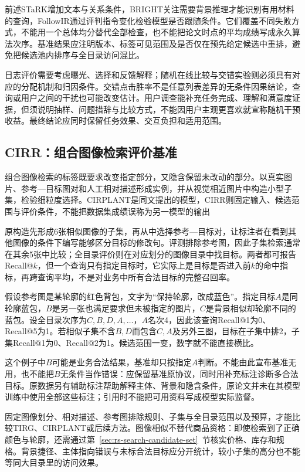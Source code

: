 前述STaRK增加文本与关系条件，BRIGHT关注需要背景推理才能识别有用材料的查询，FollowIR通过评判指令变化检验模型是否跟随条件。它们覆盖不同失败方式，不能用一个总体均分替代全部检查，也不能把论文时点的平均成绩写成永久算法次序。基准结果应注明版本、标签可见范围及是否仅在预先给定候选中重排，避免把候选池内排序与全目录访问混比。

日志评价需要考虑曝光、选择和反馈解释；随机在线比较与交错实验则必须具有对应的分配机制和归因条件。交错点击胜率不是任意列表差异的无条件因果结论，查询或用户之间的干扰也可能改变估计。用户调查能补充任务完成、理解和满意度证据，但须说明抽样、问题措辞与比较方式，不能因用户主观更喜欢就宣称随机干预收益。最终结论应同时保留任务效果、交互负担和适用范围。

\subsection{CIRR：组合图像检索评价基准}
\label{sec:rs-search-cirr}

组合图像检索的标签既要求改变指定部分，又隐含保留未改动的部分。以真实图片、参考—目标图对和人工相对描述形成实例，并从视觉相近图片中构造小型子集，检验细粒度选择。CIRPLANT是同文提出的模型，CIRR则固定输入、候选范围与评价条件，不能把数据集成绩误称为另一模型的输出

原构造先形成6张相似图像的子集，再从中选择参考—目标对，让标注者在看到其他图像的条件下编写能够区分目标的修改句。评测排除参考图，因此子集检索通常在其余5张中比较；全目录评价则在对应划分的图像目录中找目标。两者都可报告Recall@$k$，但一个查询只有指定目标时，它实际上是目标是否进入前$k$的命中指标，再跨查询平均，不是对业务中所有合法目标的完整召回率。

假设参考图是某轮廓的红色背包，文字为“保持轮廓，改成蓝色”。指定目标$A$是同轮廓蓝包，$B$是另一张也满足要求但未被指定的图片，$C$是背景相似却轮廓不同的蓝包。设全目录次序为$C,B,D,A,\ldots$，$A$名次4，因此该查询Recall@1为0、Recall@5为1。若相似子集不含$B,D$而包含$C,A$及另外三图，目标在子集中排2，子集Recall@1为0、Recall@2为1。候选范围一变，数字就不能直接横比。

这个例子中$B$可能是业务合法结果，基准却只按指定$A$判断。不能由此宣布基准无用，也不能把$B$无条件当作错误：应保留基准原协议，同时用补充标注诊断多合法目标。原数据另有辅助标注帮助解释主体、背景和隐含条件，原论文并未在其模型训练中使用全部这些标注；引用时不能把可用资料写成模型实际监督。

固定图像划分、相对描述、参考图排除规则、子集与全目录范围以及预算，才能比较TIRG、CIRPLANT或后续方法。图像相似不替代商品资格：即使检索到了正确颜色与轮廓，还需通过第~\ref{sec:rs-search-candidate-set}~节核实价格、库存和规格。背景捷径、主体指向错误与未标合法目标应分开统计，较小子集的高分也不能等同大目录里的访问效果。

